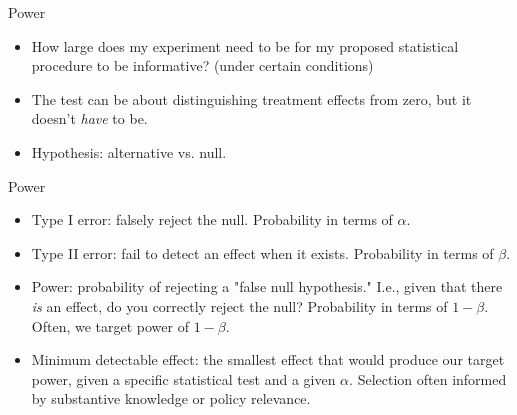 \documentclass[xcolor={dvipsnames},handout]{beamer}
\begin{document}
\begin{frame}{Power}

\begin{itemize}
\item How large does my experiment need to be for my proposed statistical procedure to be informative?  (under certain conditions)
\item The test can be about distinguishing treatment effects from zero, but it doesn't \textit{have} to be.
\item Hypothesis: alternative vs. null.
\end{itemize}

\end{frame}



\begin{frame}{Power}

\begin{itemize}
\item Type I error: falsely reject the null. Probability in terms of $\alpha$.
\item Type II error: fail to detect an effect when it exists. Probability in terms of $\beta$.
\item Power: probability of rejecting a "false null hypothesis."  I.e., given that there \textit{is} an effect, do you correctly reject the null? Probability in terms of $1 - \beta$.  Often, we target power of $1-\beta$.
\item Minimum detectable effect: the smallest effect that would produce our target power, given a specific statistical test and a given $\alpha$.  Selection often informed by substantive knowledge or policy relevance.
\end{itemize}

\end{frame}


\end{document}
